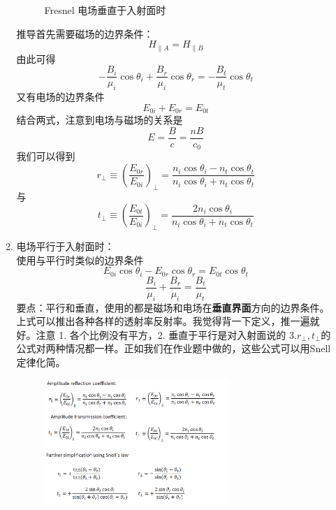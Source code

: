 \documentclass{ctexart}
\begin{document}
\begin{enumerate}
\begin{enumerate}
\begin{figure}
\caption{Fresnel 电场垂直于入射面时}
\end{figure}
推导首先需要磁场的边界条件：
\begin{equation}
H_{\| A}=H_{\| B}
\end{equation}
由此可得
\begin{equation}
-\frac{B_{i}}{\mu_{i}} \cos \theta_{i}+\frac{B_{r}}{\mu_{i}} \cos \theta_{r}=-\frac{B_{t}}{\mu_{t}} \cos \theta_{t}
\end{equation}
又有电场的边界条件
\begin{equation}
E_{0 i}+E_{0 r}=E_{0 t}
\end{equation}
结合两式，注意到电场与磁场的关系是
\begin{equation}
E=\frac{B}{c}=\frac{n B}{c_0}
\end{equation}
我们可以得到
\begin{equation}
r_{\perp} \equiv\left(\frac{E_{0 r}}{E_{0 i}}\right)_{\perp}=\frac{n_{i} \cos \theta_{i}-n_{t} \cos \theta_{t}}{n_{i} \cos \theta_{i}+n_{t} \cos \theta_{t}}
\end{equation}
与
\begin{equation}
t_{\perp} \equiv\left(\frac{E_{0 t}}{E_{0 i}}\right)_{\perp}=\frac{2 n_{i} \cos \theta_{i}}{n_{i} \cos \theta_{i}+n_{t} \cos \theta_{t}}
\end{equation}
\item 电场平行于入射面时：\\
使用与平行时类似的边界条件
\begin{equation}
E_{0 i} \cos \theta_{i}-E_{0 r} \cos \theta_{r}=E_{0 t} \cos \theta_{t}
\end{equation}
\begin{equation}
\frac{B_{i}}{\mu_{i}}+\frac{B_{r}}{\mu_{i}}=\frac{B_{t}}{\mu_{t}}
\end{equation}
要点：平行和垂直，使用的都是磁场和电场在\textbf{垂直界面}方向的边界条件。上式可以推出各种各样的透射率反射率。我觉得背一下定义，推一遍就好。注意 1. 各个比例没有平方，2. 垂直于平行是对入射面说的 3.$r_{\perp},t_{\perp}$的公式对两种情况都一样。正如我们在作业题中做的，这些公式可以用Snell定律化简。
\begin{figure}
\center
\includegraphics[width=0.7\textwidth]{Fresnel垂直公式表.png}

\end{figure}
\end{enumerate}
\end{enumerate}
\end{document}
